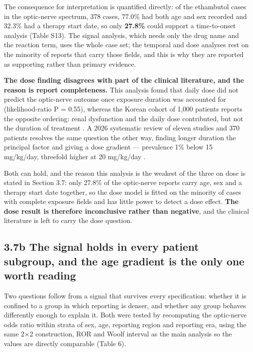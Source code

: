 \documentclass[utf8]{FrontiersinVancouver}
\begin{document}
The consequence for interpretation is quantified directly: of the ethambutol cases in the optic-nerve spectrum, 378 cases, 77.0\% had both age and sex recorded and 32.3\% had a therapy start date, so only \textbf{27.8\%} could support a time-to-onset analysis (Table S13). The signal analysis, which needs only the drug name and the reaction term, uses the whole case set; the temporal and dose analyses rest on the minority of reports that carry those fields, and this is why they are reported as supporting rather than primary evidence.

\textbf{The dose finding disagrees with part of the clinical literature, and the reason is report completeness.} This analysis found that daily dose did not predict the optic-nerve outcome once exposure duration was accounted for (likelihood-ratio P = 0.55), whereas the Korean cohort of 1,000 patients reports the opposite ordering: renal dysfunction and the daily dose contributed, but not the duration of treatment \citep{l2008}. A 2026 systematic review of eleven studies and 370 patients resolves the same question the other way, finding longer duration the principal factor and giving a dose gradient --- prevalence 1\% below 15 mg/kg/day, threefold higher at 20 mg/kg/day \citep{c2026}.

Both can hold, and the reason this analysis is the weakest of the three on dose is stated in Section 3.7: only 27.8\% of the optic-nerve reports carry age, sex and a therapy start date together, so the dose model is fitted on the minority of cases with complete exposure fields and has little power to detect a dose effect. \textbf{The dose result is therefore inconclusive rather than negative}, and the clinical literature is left to carry the dose question.

\subsection{3.7b The signal holds in every patient subgroup, and the age gradient is the only one worth reading}

Two questions follow from a signal that survives every specification: whether it is confined to a group in which reporting is denser, and whether any group behaves differently enough to explain it. Both were tested by recomputing the optic-nerve odds ratio within strata of sex, age, reporting region and reporting era, using the same 2$\times$2 construction, ROR and Woolf interval as the main analysis so the values are directly comparable (Table 6).
\end{document}
